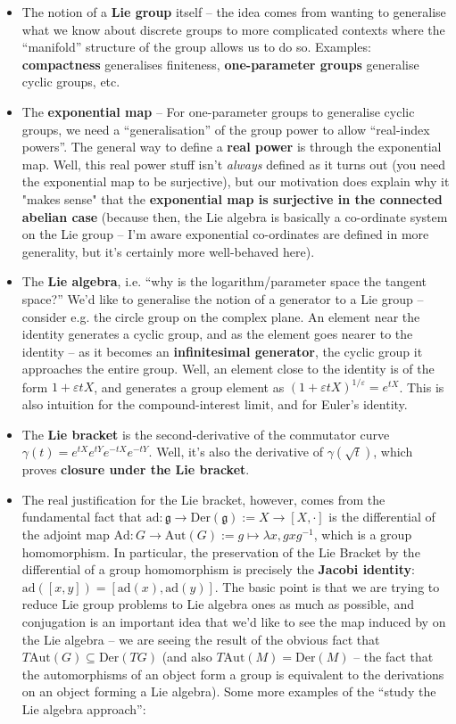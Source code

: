\documentclass{article}
\begin{document}
\begin{itemize}
 \item The notion of a \textbf{Lie group} itself -- the idea comes from wanting to generalise what we know about discrete groups to more complicated contexts where the ``manifold'' structure of the group allows us to do so. Examples: \textbf{compactness} generalises finiteness, \textbf{one-parameter groups} generalise cyclic groups, etc.
 \item The \textbf{exponential map} -- For one-parameter groups to generalise cyclic groups, we need a ``generalisation'' of the group power to allow ``real-index powers''. The general way to define a \textbf{real power} is through the exponential map. Well, this real power stuff isn't \emph{always} defined as it turns out (you need the exponential map to be surjective), but our motivation does explain why it "makes sense" that the \textbf{exponential map is surjective in the connected abelian case} (because then, the Lie algebra is basically a co-ordinate system on the Lie group -- I'm aware exponential co-ordinates are defined in more generality, but it's certainly more well-behaved here).
 \item The \textbf{Lie algebra}, i.e. ``why is the logarithm/parameter space the tangent space?'' We'd like to generalise the  notion of a generator to a Lie group -- consider e.g. the circle group on the complex plane. An element near the identity generates a cyclic group, and as the element goes nearer to the identity -- as it becomes an \textbf{infinitesimal generator}, the cyclic group it approaches the entire group. Well, an element close to the identity is of the form $1+\varepsilon t X$, and generates a group element as $(1+\varepsilon tX)^{1/\varepsilon}=e^{tX}$. This is also intuition for the compound-interest limit, and for Euler's identity.
 \item The \textbf{Lie bracket} is the second-derivative of the commutator curve $\gamma(t)=e^{tX}e^{tY}e^{-tX}e^{-tY}$. Well, it's also the derivative of $\gamma(\sqrt{t})$, which proves \textbf{closure under the Lie bracket}. 
 \item The real justification for the Lie bracket, however, comes from the fundamental fact that $\mathrm{ad}:\mathfrak{g}\to\mathrm{Der}(\mathfrak{g}):=X\to[X,\cdot]$ is the differential of the adjoint map $\mathrm{Ad}:G\to\mathrm{Aut}(G):=g\mapsto\lambda x, gxg^{-1}$, which is a group homomorphism. In particular, the preservation of the Lie Bracket by the differential of a group homomorphism is precisely the \textbf{Jacobi identity}: $\mathrm{ad}([x,y])=[\mathrm{ad}(x),\mathrm{ad}(y)]$. The basic point is that we are trying to reduce Lie group problems to Lie algebra ones as much as possible, and conjugation is an important idea that we'd like to see the map induced by on the Lie algebra -- we are seeing the result of the obvious fact that $T\mathrm{Aut}(G)\subseteq\mathrm{Der}(TG)$ (and also $T\mathrm{Aut}(M)=\mathrm{Der}(M)$ -- the fact that the automorphisms of an object form a group is equivalent to the derivations on an object forming a Lie algebra). Some more examples of the ``study the Lie algebra approach'': 

\end{itemize}
\end{document}
